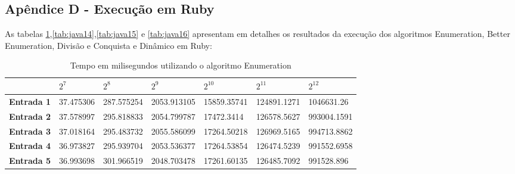 \documentclass[
	12pt,				%
	oneside,   	        %
	a4paper,			%
	english,			%
	french,				%
	spanish,			%
	brazil,				%
	]{pacotes/abntex2}
\begin{document}
\newpage
\begin{apendicesenv}

\section*{Apêndice D - Execução em Ruby}

As tabelas \ref{tab:java13},\ref{tab:java14},\ref{tab:java15} e \ref{tab:java16} apresentam em detalhes os resultados da execução dos
algoritmos Enumeration, Better Enumeration, Divisão e Conquista e Dinâmico em Ruby:

\begin{table}[!htb]
\centering
\caption{Tempo em milisegundos utilizando o algoritmo Enumeration}
\label{tab:java13}
\footnotesize   %
\begin{tabular}{l|llllll}
\toprule
& \textbf{$2^7$} & \textbf{$2^8$} & \textbf{$2^9$} & \textbf{$2^{10}$} & \textbf{$2^{11}$} & \textbf{$2^{12}$}\\ 
\midrule
\textbf{Entrada 1} & 37.475306 &	287.575254 & 2053.913105 & 15859.35741 & 124891.1271 & 1046631.26\\
\textbf{Entrada 2} & 37.578997 &	295.818833 & 2054.799787 & 17472.3414 & 126578.5627 & 993004.1591\\
\textbf{Entrada 3} & 37.018164 &	295.483732 & 2055.586099 & 17264.50218 & 126969.5165 & 994713.8862\\
\textbf{Entrada 4} & 36.973827 & 295.939704 & 2053.536377 & 17264.53854 & 126474.5239 & 991552.6958\\
\textbf{Entrada 5} & 36.993698 & 301.966519 & 2048.703478 & 17261.60135 & 126485.7092 & 991528.896\\

 \bottomrule
\end{tabular}
\end{table}



\end{apendicesenv}
\end{document}
